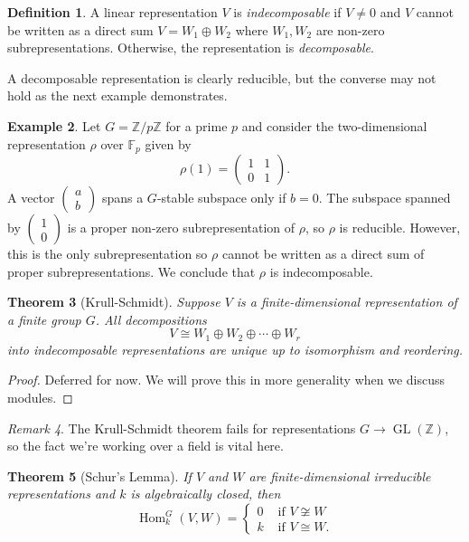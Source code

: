\documentclass[12pt]{article}
\theoremstyle{plain}
\newtheorem{theorem}{Theorem}[section]
\theoremstyle{definition}
\newtheorem{definition}[theorem]{Definition}
\newtheorem{example}[theorem]{Example}
\theoremstyle{remark}
\newtheorem{remark}[theorem]{Remark}
\numberwithin{equation}{section}
\begin{document}
\begin{definition}
A linear representation $V$ is \emph{indecomposable} if $V \ne 0$ and
$V$ cannot be written as a direct sum $V = W_1 \oplus W_2$ where
$W_1, W_2$ are non-zero subrepresentations.
Otherwise, the representation is \emph{decomposable}.
\end{definition}

A decomposable representation is clearly reducible, but the converse may
not hold as the next example demonstrates.

\begin{example}
Let $G=\mathbb{Z}/p\mathbb{Z}$ for a prime $p$
and consider the two-dimensional representation $\rho$ over $\mathbb{F}_p$
given by
\[
\rho(1) = \begin{pmatrix} 1&1\\0&1 \end{pmatrix} .
\]
A vector $\begin{pmatrix} a\\b \end{pmatrix} $ spans a
$G$-stable subspace only if $b=0$.
The subspace spanned by $\begin{pmatrix} 1\\0 \end{pmatrix}$
is a proper non-zero subrepresentation
of $\rho$, so $\rho$ is reducible.
However, this is the only subrepresentation so $\rho$
cannot be written as a direct sum of proper subrepresentations.
We conclude that $\rho$ is indecomposable.
\end{example}

\begin{theorem}[Krull-Schmidt]
Suppose $V$ is a finite-dimensional representation of a finite group $G$.
All decompositions
\[
V \cong W_1 \oplus W_2 \oplus \cdots \oplus W_r
\]
into indecomposable representations are unique up to isomorphism
and reordering.
\end{theorem}

\begin{proof}
Deferred for now.  We will prove this in more generality when we discuss
modules.
\end{proof}

\begin{remark}
The Krull-Schmidt theorem fails for representations $G \to
\operatorname{GL}(\mathbb{Z})$, so the fact we're working
over a field is vital here.
\end{remark}

\begin{theorem}[Schur's Lemma]
If $V$ and $W$ are finite-dimensional irreducible representations
and $k$ is algebraically closed, then
\[
\operatorname{Hom}_k^G(V,W) =
\begin{cases}
0 & \textrm{ if } V \not\cong W\\
k & \textrm{ if } V \cong W.
\end{cases}
\]
\end{theorem}
\end{document}
